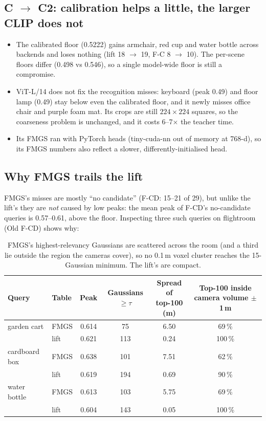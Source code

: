 \documentclass[11pt,a4paper]{article}
\begin{document}
\subsection{C $\rightarrow$ C2: calibration helps a little, the larger CLIP does not}
\begin{itemize}
  \item The calibrated floor (0.5222) gains armchair, red cup and water bottle across backends and loses nothing (lift
        18 $\rightarrow$ 19, F-C 8 $\rightarrow$ 10). The per-scene floors differ (0.498 vs 0.546), so a single model-wide floor
        is still a compromise.
  \item ViT-L/14 does not fix the recognition misses: keyboard (peak 0.49) and floor lamp (0.49) stay below even the
        calibrated floor, and it newly misses office chair and purple foam mat. Its crops are still $224\times224$ squares,
        so the coarseness problem is unchanged, and it costs 6--7$\times$ the teacher time.
  \item Its FMGS ran with PyTorch heads (tiny-cuda-nn out of memory at 768-d), so its FMGS numbers also reflect a
        slower, differently-initialised head.
\end{itemize}

\subsection{Why FMGS trails the lift}
\label{sec:fmgs}
FMGS's misses are mostly ``no candidate'' (F-CD: 15--21 of 29), but unlike the lift's they are \emph{not} caused by low
peaks: the mean peak of F-CD's no-candidate queries is 0.57--0.61, above the floor. Inspecting three such queries on
flightroom (Old F-CD) shows why:

\begin{table}[ht]
\centering\small
\begin{tabular}{@{}llcccc@{}}
\toprule
Query & Table & Peak & \shortstack{Gaussians\\$\ge\tau$} & \shortstack{Spread of\\top-100 (m)} & \shortstack{Top-100 inside camera\\volume $\pm$1\,m} \\
\midrule
garden cart   & FMGS & 0.614 & 75  & 6.50 & 69\,\% \\
              & lift & 0.621 & 113 & 0.24 & 100\,\% \\
cardboard box & FMGS & 0.638 & 101 & 7.51 & 62\,\% \\
              & lift & 0.619 & 194 & 0.69 & 90\,\% \\
water bottle  & FMGS & 0.613 & 103 & 5.75 & 69\,\% \\
              & lift & 0.604 & 143 & 0.05 & 100\,\% \\
\bottomrule
\end{tabular}
\caption{FMGS's highest-relevancy Gaussians are scattered across the room (and a third lie outside the region the
cameras cover), so no 0.1\,m voxel cluster reaches the 15-Gaussian minimum. The lift's are compact.}
\end{table}
\end{document}
